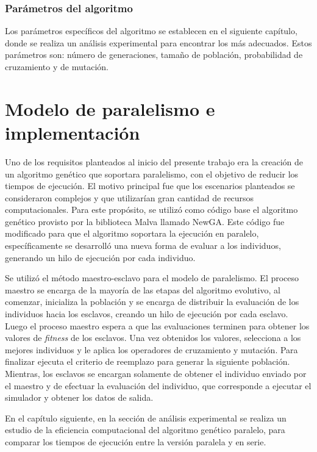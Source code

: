 \subsubsection{Parámetros del algoritmo}
Los parámetros específicos del algoritmo se establecen en el siguiente capítulo, donde se realiza un análisis experimental para encontrar los más adecuados. Estos parámetros son: número de generaciones, tamaño de población, probabilidad de cruzamiento y de mutación.


\section{Modelo de paralelismo e implementación}

Uno de los requisitos planteados al inicio del presente trabajo era la creación de un algoritmo genético que soportara paralelismo, con el objetivo de reducir los tiempos de ejecución. El motivo principal fue que los escenarios planteados se consideraron complejos y que utilizarían gran cantidad de recursos computacionales. Para este propósito, se utilizó como código base el algoritmo genético provisto por la biblioteca Malva llamado NewGA. Este código fue modificado para que el algoritmo soportara la ejecución en paralelo, específicamente se desarrolló una nueva forma de evaluar a los individuos, generando un hilo de ejecución por cada individuo.

Se utilizó el método maestro-esclavo para el modelo de paralelismo. El proceso maestro se encarga de la mayoría de las etapas del algoritmo evolutivo, al comenzar, inicializa la población y se encarga de distribuir la evaluación de los individuos hacia los esclavos, creando un hilo de ejecución por cada esclavo. Luego el proceso maestro espera a que las evaluaciones terminen para obtener los valores de \emph{fitness} de los esclavos. Una vez obtenidos los valores, selecciona a los mejores individuos y le aplica los operadores de cruzamiento y mutación. Para finalizar ejecuta el criterio de reemplazo para generar la siguiente población. Mientras, los esclavos se encargan solamente de obtener el individuo enviado por el maestro y de efectuar la evaluación del individuo, que corresponde a ejecutar el simulador y obtener los datos de salida.

En el capítulo siguiente, en la sección de análisis experimental se realiza un estudio de la eficiencia computacional del algoritmo genético paralelo, para comparar los tiempos de ejecución entre la versión paralela y en serie.